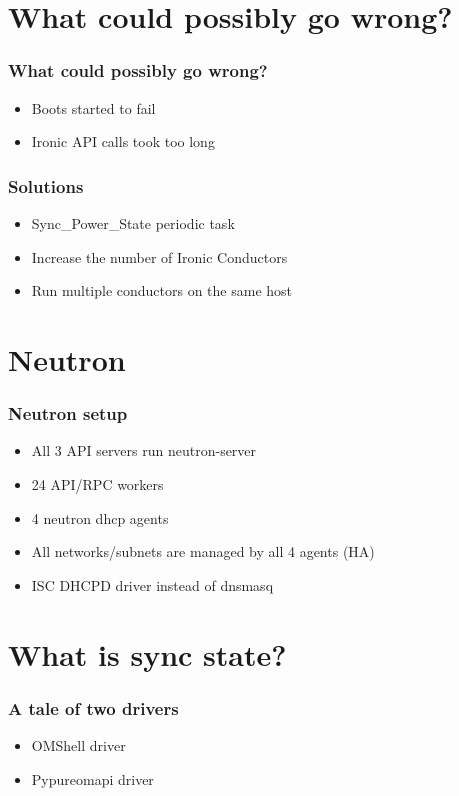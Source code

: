 \documentclass[aspectratio=169,11pt,hyperref={colorlinks=true}]{beamer}
\begin{document}
\section{What could possibly go wrong?}

\begin{frame}
    \frametitle{What could possibly go wrong?}
    \begin{itemize}[<+-| alert@+>]
        \item Boots started to fail
        \item Ironic API calls took too long
    \end{itemize}
\end{frame}

\begin{frame}
    \frametitle{Solutions}
    \begin{itemize}[<+-| alert@+>]
        \item Sync\_Power\_State periodic task
        \item Increase the number of Ironic Conductors
        \item Run multiple conductors on the same host
    \end{itemize}
\end{frame}


\section{Neutron}
\begin{frame}
    \frametitle{Neutron setup}
    \begin{itemize}[<+-| alert@+>]
        \item All 3 API servers run neutron-server
        \item 24 API/RPC workers
        \item 4 neutron dhcp agents
        \item All networks/subnets are managed by all 4 agents (HA)
        \item ISC DHCPD driver instead of dnsmasq
    \end{itemize}
\end{frame}

\section{What is sync state?}
\begin{frame}
    \frametitle{A tale of two drivers}
    \begin{itemize}[<+-| alert@+>]
        \item OMShell driver
        \item Pypureomapi driver
    \end{itemize}
\end{frame}
\end{document}
